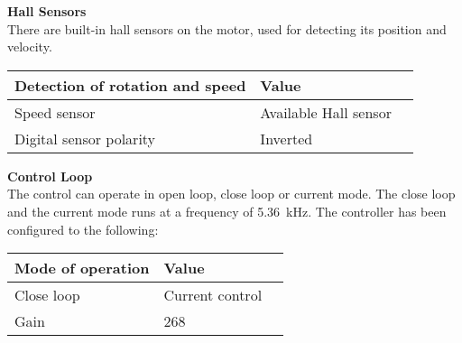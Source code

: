 \textbf{Hall Sensors}\\
There are built-in hall sensors on the motor, used for detecting its position and velocity. 
\begin{table}[H]
	\centering
	\begin{tabular}{|l|l|p{4.3cm}|}
		\hline%
		\textbf{Detection of rotation and speed}       &  \textbf{Value}         \\
		\hline%
		Speed sensor                                & Available Hall sensor           \\
		\hline%
		Digital sensor polarity							  & Inverted              \\
		\hline%
	\end{tabular}
\end{table}

\textbf{Control Loop}\\
The control can operate in open loop, close loop or current mode. The close loop and the current mode runs at a frequency of \SI{5,36}{kHz}. The controller has been configured to the following:
\begin{table}[H]
	\centering
	\begin{tabular}{|l|l|p{4.3cm}|}
		\hline%
		\textbf{Mode of operation}       &  \textbf{Value}         \\
		\hline%
		Close loop                                & Current control           \\
		\hline%
		Gain							  & 268              \\
		\hline%
	\end{tabular}
\end{table}

